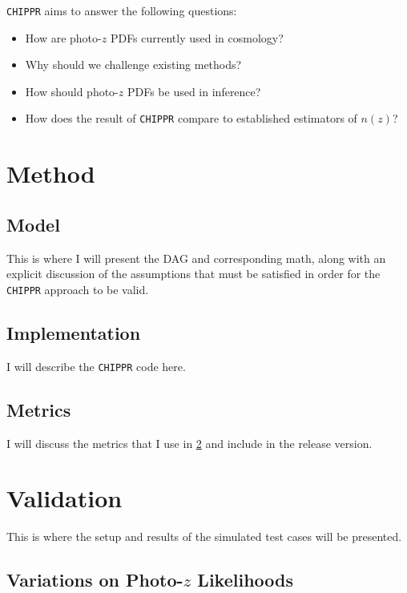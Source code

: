 \documentclass[preprint]{aastex}
\newcommand{\chippr}{\texttt{CHIPPR} }
\begin{document}
\chippr aims to answer the following questions:

\begin{itemize}
	\item How are photo-$z$ PDFs currently used in cosmology?
	\item Why should we challenge existing methods?
	\item How should photo-$z$ PDFs be used in inference?
	\item How does the result of \chippr compare to established estimators 
of $n(z)$?
\end{itemize}

\section{Method}
\label{sec:method}

\subsection{Model}
\label{sec:model}

This is where I will present the DAG and corresponding math, along with an 
explicit discussion of the assumptions that must be satisfied in order for the 
\chippr approach to be valid.

\subsection{Implementation}
\label{sec:implementation}

I will describe the \chippr code here.

\subsection{Metrics}
\label{sec:metrics}

I will discuss the metrics that I use in \ref{sec:validation} and include in 
the release version.

\section{Validation}
\label{sec:validation}

This is where the setup and results of the simulated test cases will be 
presented.

\subsection{Variations on Photo-$z$ Likelihoods}
\label{sec:likelihoods}
\end{document}
